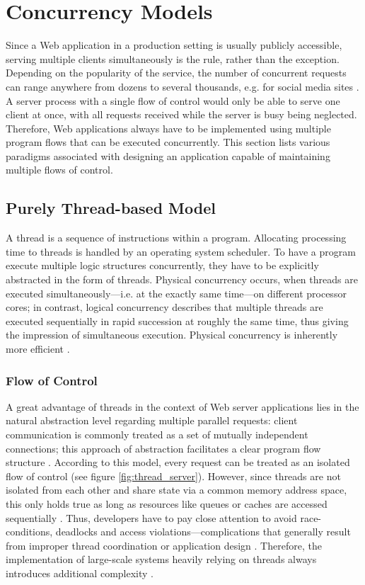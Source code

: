 \section{Concurrency Models}
\label{sec:concurrency}

Since a Web application in a production setting is usually publicly accessible, serving multiple clients simultaneously is the rule, rather than the exception. Depending on the popularity of the service, the number of concurrent requests can range anywhere from dozens to several thousands, e.g. for social media sites \cite[p. 1]{Drolia2010}. A server process with a single flow of control would only be able to serve one client at once, with all requests received while the server is busy being neglected. Therefore, Web applications always have to be implemented using multiple program flows that can be executed concurrently. This section lists various paradigms associated with designing an application capable of maintaining multiple flows of control.

\subsection{Purely Thread-based Model}
\label{sec:threads}
A thread is a sequence of instructions within a program. Allocating processing time to threads is handled by an operating system scheduler. To have a program execute multiple logic structures concurrently, they have to be explicitly abstracted in the form of threads. Physical concurrency occurs, when threads are executed simultaneously---i.e. at the exactly same time---on different processor cores; in contrast, logical concurrency describes that multiple threads are executed sequentially in rapid succession at roughly the same time, thus giving the impression of simultaneous execution. Physical concurrency is inherently more efficient \cite{ThreadsJava}.

\subsubsection*{Flow of Control}
A great advantage of threads in the context of Web server applications lies in the natural abstraction level regarding multiple parallel requests: client communication is commonly treated as a set of mutually independent connections; this approach of abstraction facilitates a clear program flow structure \cite{Veal2007}. According to this model, every request can be treated as an isolated flow of control (see figure \ref{fig:thread_server}). However, since threads are not isolated from each other and share state via a common memory address space, this only holds true as long as resources like queues or caches are accessed sequentially \cite[p. 2]{Behren2003}. Thus, developers have to pay close attention to avoid race-conditions, deadlocks and access violations---complications that generally result from improper thread coordination or application design \cite[p. 1]{Fischer2007}. Therefore, the implementation of large-scale systems heavily relying on threads always introduces additional complexity \cite[p. 1]{Lee2006}.

